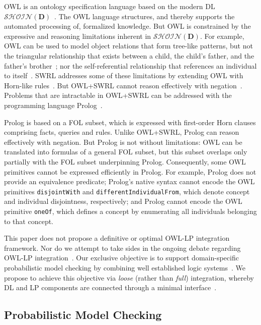 OWL is an ontology specification language based on the modern DL $\mathcal{SHOIN(\mathbf{D})}$~\cite{Horrocks_2011}. The OWL language structures, and thereby supports the automated processing of, formalized knowledge. But OWL is constrained by the expressive and reasoning limitations inherent in $\mathcal{SHOIN(\mathbf{D})}$. For example, OWL can be used to model object relations that form tree-like patterns, but not the triangular relationship that exists between a child, the child's father, and the father's brother~\cite{Motik_2006}; nor the self-referential relationship that references an individual to itself~\cite{Krotzsch_2011}. SWRL addresses some of these limitations by extending OWL with Horn-like rules~\cite{Horrocks_2004}. But OWL+SWRL cannot reason effectively with negation~\cite{Motik_2006,McGrath_2008}. Problems that are intractable in OWL+SWRL can be addressed with the programming language Prolog~\cite{Motik_2006,Volz_2003}.

Prolog is based on a FOL subset, which is expressed with first-order Horn clauses comprising facts, queries and rules. Unlike OWL+SWRL, Prolog can reason effectively with ne\-gation. But Prolog is not without limitations: OWL can be translated into formulas of a general FOL subset, but this subset overlaps only partially with the FOL subset underpinning Prolog. Consequently, some OWL primitives cannot be expressed efficiently in Prolog. For example, Prolog does not provide an equivalence predicate; Prolog's native syntax cannot encode the OWL primitives \texttt{disjointWith} and \texttt{differentIndividualFrom}, which denote concept and individual disjointness, respectively; and Prolog cannot encode the OWL primitive \texttt{oneOf}, which defines a concept by enumerating all individuals belonging to that concept.

This paper does not propose a definitive or optimal OWL-LP integration framework. Nor do we attempt to take sides in the ongoing debate regarding OWL-LP integration~\cite{Motik_2006}. Our exclusive objective is to support domain-specific probabilistic model checking by combining well established logic systems~\cite{Motik_2006,Costa_2012}. We propose to achieve this objective via \emph{loose} (rather than \emph{full}) integration, whereby DL and LP components are connected through a minimal interface~\cite{Greco_2010}.

\subsection{Probabilistic Model Checking}

